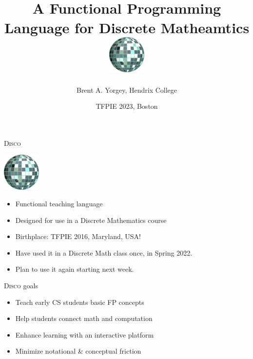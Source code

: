 \documentclass[fleqn,xcolor={usenames,dvipsnames,svgnames,table},12pt,aspectratio=169]{beamer}
\title{\disco \\ \small{A Functional Programming Language for Discrete
  Matheamtics} \\ \bigskip \includegraphics[width=0.75in]{logo.png}}
\date{TFPIE 2023, Boston}
\author{Brent A. Yorgey, Hendrix College}
\newcommand{\disco}{\textsc{Disco}\xspace}
\begin{document}
\maketitle

\begin{frame}{\disco}
  \begin{center}\includegraphics[width=0.75in]{logo.png}\end{center}

  \begin{itemize}
  \item Functional teaching language
  \item Designed for use in a Discrete Mathematics course
  \item Birthplace: TFPIE 2016, Maryland, USA!
  \item Have used it in a Discrete Math class once, in
    Spring 2022.
  \item Plan to use it again starting next week.
  \end{itemize}
\end{frame}

\begin{frame}{\disco goals}
  \begin{itemize}
  \item Teach early CS students basic FP concepts
  \item Help students connect math and computation
  \item Enhance learning with an interactive platform
  \item Minimize notational \& conceptual friction
  \end{itemize}
\end{frame}
\end{document}
